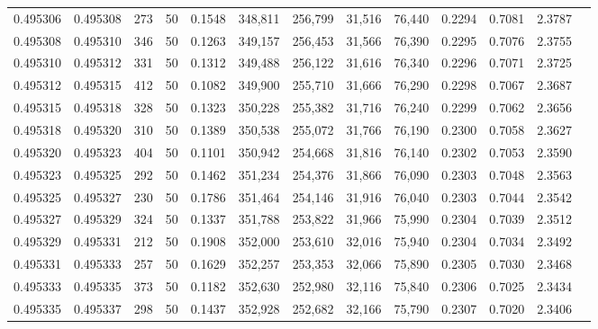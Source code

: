 \begin{tabular}{rrrrrrrrrrrrr}
0.495306 & 0.495308 &   273 &  50 &                                     0.1548 & 348,811 & 256,799 &  31,516 &  76,440 & 0.2294 & 0.7081 & 2.3787 \\
0.495308 & 0.495310 &   346 &  50 &                                     0.1263 & 349,157 & 256,453 &  31,566 &  76,390 & 0.2295 & 0.7076 & 2.3755 \\
0.495310 & 0.495312 &   331 &  50 &                                     0.1312 & 349,488 & 256,122 &  31,616 &  76,340 & 0.2296 & 0.7071 & 2.3725 \\
0.495312 & 0.495315 &   412 &  50 &                                     0.1082 & 349,900 & 255,710 &  31,666 &  76,290 & 0.2298 & 0.7067 & 2.3687 \\
0.495315 & 0.495318 &   328 &  50 &                                     0.1323 & 350,228 & 255,382 &  31,716 &  76,240 & 0.2299 & 0.7062 & 2.3656 \\
0.495318 & 0.495320 &   310 &  50 &                                     0.1389 & 350,538 & 255,072 &  31,766 &  76,190 & 0.2300 & 0.7058 & 2.3627 \\
0.495320 & 0.495323 &   404 &  50 &                                     0.1101 & 350,942 & 254,668 &  31,816 &  76,140 & 0.2302 & 0.7053 & 2.3590 \\
0.495323 & 0.495325 &   292 &  50 &                                     0.1462 & 351,234 & 254,376 &  31,866 &  76,090 & 0.2303 & 0.7048 & 2.3563 \\
0.495325 & 0.495327 &   230 &  50 &                                     0.1786 & 351,464 & 254,146 &  31,916 &  76,040 & 0.2303 & 0.7044 & 2.3542 \\
0.495327 & 0.495329 &   324 &  50 &                                     0.1337 & 351,788 & 253,822 &  31,966 &  75,990 & 0.2304 & 0.7039 & 2.3512 \\
0.495329 & 0.495331 &   212 &  50 &                                     0.1908 & 352,000 & 253,610 &  32,016 &  75,940 & 0.2304 & 0.7034 & 2.3492 \\
0.495331 & 0.495333 &   257 &  50 &                                     0.1629 & 352,257 & 253,353 &  32,066 &  75,890 & 0.2305 & 0.7030 & 2.3468 \\
0.495333 & 0.495335 &   373 &  50 &                                     0.1182 & 352,630 & 252,980 &  32,116 &  75,840 & 0.2306 & 0.7025 & 2.3434 \\
0.495335 & 0.495337 &   298 &  50 &                                     0.1437 & 352,928 & 252,682 &  32,166 &  75,790 & 0.2307 & 0.7020 & 2.3406 \\

\end{tabular}
